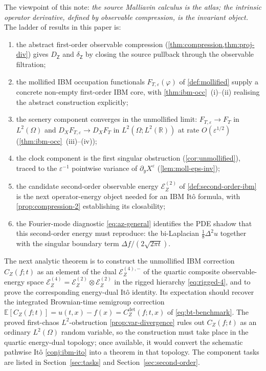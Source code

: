 \documentclass[11pt,reqno]{amsart}
\theoremstyle{plain}
\theoremstyle{definition}
\theoremstyle{remark}
\newcommand{\R}{\mathbb{R}}
\newcommand{\E}{\mathbb{E}}
\newcommand{\Energy}{\mathcal{E}}
\newcommand{\Obs}{\mathsf{Z}}
\newcommand{\IBM}{Z}
\begin{document}
The viewpoint of this note: \emph{the source Malliavin calculus is the
atlas; the intrinsic operator derivative, defined by observable
compression, is the invariant object.} The ladder of results in this
paper is:
\begin{enumerate}
\item the abstract first-order observable compression
  (\cref{thm:compression,thm:proj-div}) gives $D_\Obs$ and $\delta_\Obs$
  by closing the source pullback through the observable filtration;
\item the mollified IBM occupation functionals $F_{T,\varepsilon}(\varphi)$
  of \cref{def:mollified} supply a concrete non-empty first-order IBM
  core, with \cref{thm:ibm-occ}~(i)--(ii) realising the abstract
  construction explicitly;
\item the scenery component converges in the unmollified limit:
  $F_{T,\varepsilon}\to F_T$ in $L^{2}(\Omega)$ and
  $D_XF_{T,\varepsilon}\to D_XF_T$ in $L^{2}(\Omega;L^{2}(\R))$ at rate
  $O(\varepsilon^{1/2})$ (\cref{thm:ibm-occ}~(iii)--(iv));
\item the clock component is the first singular obstruction
  (\cref{cor:unmollified}), traced to the $\varepsilon^{-1}$ pointwise
  variance of $\partial_yX^\varepsilon$ (\cref{lem:moll-eps-inv});
\item the candidate second-order observable energy
  $\Energy_\IBM^{(2)}$ of \cref{def:second-order-ibm} is the next
  operator-energy object needed for an IBM It\^o formula, with
  \cref{prop:compression-2} establishing its closability;
\item the Fourier-mode diagnostic \eqref{eq:az-general} identifies the
  PDE shadow that this second-order energy must reproduce: the
  bi-Laplacian $\tfrac18\Delta^{2}u$ together with the singular
  boundary term $\Delta f/(2\sqrt{2\pi t})$.
\end{enumerate}
The next analytic theorem is to construct the unmollified IBM
correction $C_\IBM(f;t)$ as an element of the dual
$\Energy_\IBM^{(4),-}$ of the quartic composite observable-energy
space $\Energy_\IBM^{(4)}=\Energy_\IBM^{(2)}\otimes\Energy_\IBM^{(2)}$
in the rigged hierarchy \eqref{eq:rigged-4}, and to prove the
corresponding energy-dual It\^o identity. Its expectation should
recover the integrated Brownian-time semigroup correction
$\E[C_\IBM(f;t)]=u(t,x)-f(x)=C^{\mathrm{det}}_\IBM(f;t,x)$ of
\eqref{eq:bt-benchmark}. The proved first-chaos $L^{2}$-obstruction
\cref{prop:var-divergence} rules out $C_\IBM(f;t)$ as an ordinary
$L^{2}(\Omega)$ random variable, so the construction must take
place in the quartic energy-dual topology; once available, it
would convert the schematic pathwise It\^o \cref{conj:ibm-ito} into
a theorem in that topology. The component tasks are listed in
Section~\ref{sec:tasks} and Section~\ref{sec:second-order}.
\end{document}
